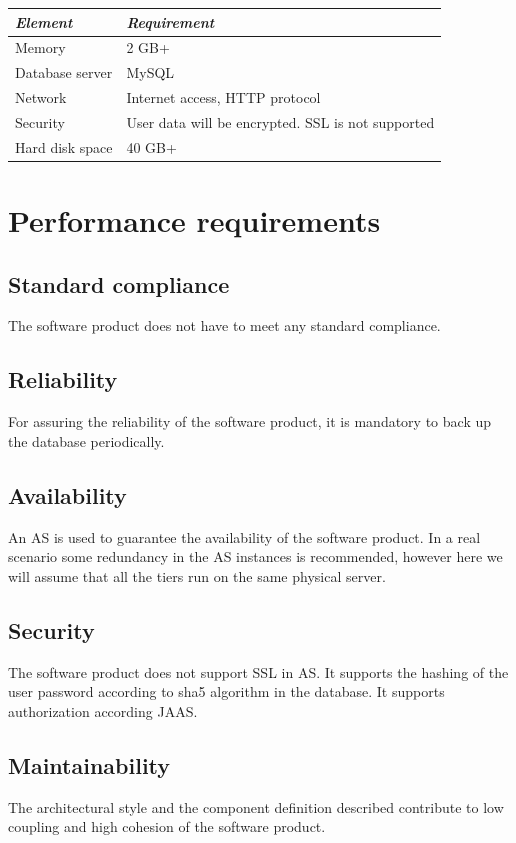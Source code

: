 \documentclass[10pt,a4paper,titlepage]{article}
\begin{document}
\noindent\begin{tabular}{| l | l |}
\hline	\emph{Element}	&	\emph{Requirement}	\\
\hline	Memory			&	2 GB+				\\
\hline	Database server	&	MySQL				\\
\hline	Network			&	Internet access, HTTP protocol	\\
\hline	Security		&	User data will be encrypted. SSL is not supported	\\
\hline	Hard disk space	&	40 GB+				\\
\hline
\end{tabular}

\section{Performance requirements}
\subsection{Standard compliance}
The software product does not have to meet any standard compliance.

\subsection{Reliability}
For assuring the reliability of the software product, it is mandatory to back up the database periodically.

\subsection{Availability}
An AS is used to guarantee the availability of the software product. In a real scenario some redundancy in the AS instances is recommended, however here we will assume that all the tiers run on the same physical server.

\subsection{Security}
The software product does not support SSL in AS. It supports the hashing of the user password according to sha5 algorithm in the database. It supports authorization according JAAS.

\subsection{Maintainability}
The architectural style and the component definition described contribute to low coupling and high cohesion of the software product.
\end{document}
